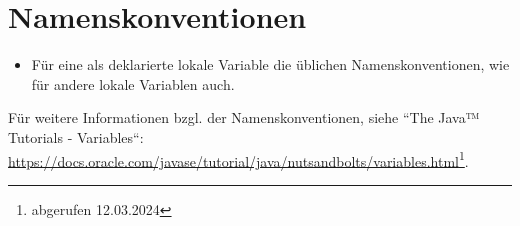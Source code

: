 \section{Namenskonventionen}

\begin{itemize}
    \item Für eine als  deklarierte lokale Variable die üblichen Namenskonventionen, wie für andere lokale Variablen auch.
\end{itemize}

Für weitere Informationen bzgl. der Namenskonventionen, siehe ``The Java™ Tutorials - Variables``: \url{https://docs.oracle.com/javase/tutorial/java/nutsandbolts/variables.html}\footnote{
abgerufen 12.03.2024
}.
